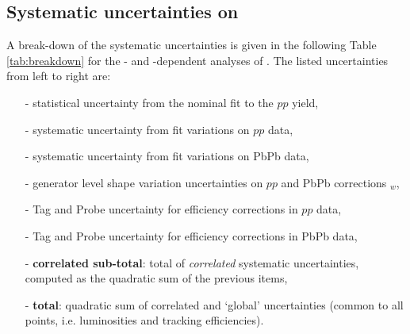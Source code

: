\subsection{Systematic uncertainties on \texorpdfstring{\RAA}{RAA}}
A break-down of the systematic uncertainties is given in the following
Table \ref{tab:breakdown} for the \pt- and \y-dependent analyses of
\PgUa. The listed uncertainties from left to right
are:
\begin{itemize}
\item[-] statistical uncertainty from the nominal fit to the
  $pp$ yield,
\item[-] systematic uncertainty from fit variations on $pp$ data,
\item[-] systematic uncertainty from fit variations on PbPb data,
\item[-] generator level shape variation uncertainties on $pp$ and PbPb corrections \acc\eff$_{w}$,
\item[-] Tag and Probe uncertainty for efficiency corrections in
  $pp$ data,
\item[-] Tag and Probe uncertainty for efficiency corrections in PbPb data,
\item[-] \textbf{correlated sub-total}: total of \textit{correlated} systematic uncertainties, computed as the quadratic sum of the previous items,
\item[-] \textbf{total}: quadratic sum of correlated and `global' uncertainties (common to all points, i.e. luminosities
  and tracking efficiencies).
\end{itemize}
